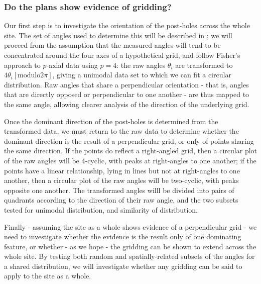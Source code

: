 \documentclass[../../ArchStats.tex]{subfiles}
\begin{document}
\subsubsection{Do the plans show evidence of gridding?}

Our first step is to investigate the orientation of the post-holes across the whole site. The set of angles used to determine this will be described in ; we will proceed from the assumption that the measured angles will tend to be concentrated around the four axes of a hypothetical grid, and follow Fisher's approach to $p$-axial data \cite{Fisher1993} using $p=4$: the raw angles $\theta_i$ are transformed to $4\theta_i \left[ \text{modulo} 2\pi \right]$, giving a unimodal data set to which we can fit a circular distribution. Raw angles that share a perpendicular orientation - that is, angles that are directly opposed or perpendicular to one another - are thus mapped to the same angle, allowing clearer analysis of the direction of the underlying grid.

Once the dominant direction of the post-holes is determined from the transformed data, we must return to the raw data to determine whether the dominant direction is the result of a perpendicular grid, or only of points sharing the same direction. If the points do reflect a right-angled grid, then a circular plot of the raw angles will be 4-cyclic, with peaks at right-angles to one another; if the points have a linear relationship, lying in lines but not at right-angles to one another, then a circular plot of the raw angles will be two-cyclic, with peaks opposite one another. The transformed angles willl be divided into pairs of quadrants according to the direction of their raw angle, and the two subsets tested for unimodal distribution, and similarity of distribution.


Finally - assuming the site as a whole shows evidence of a perpendicular grid - we need to investigate whether the evidence is the result only of one dominating feature, or whether - as we hope - the gridding can be shown to extend across the whole site. By testing both random and spatially-related subsets of the angles for a shared distribution, we will investigate whether any gridding can be said to apply to the site as a whole.

\end{document}
